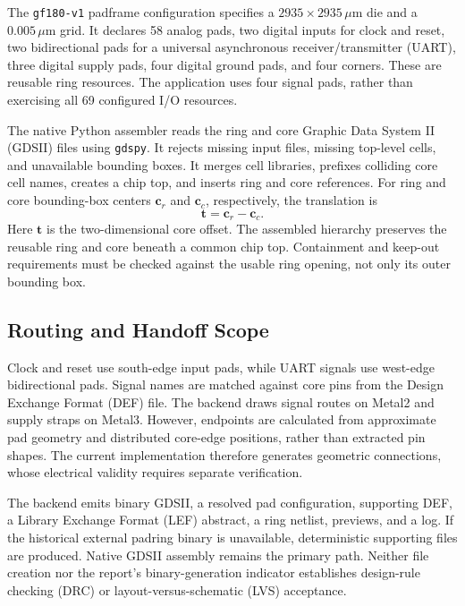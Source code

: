 \documentclass[conference,letterpaper]{IEEEtran}
\begin{document}
The \texttt{gf180-v1} padframe configuration specifies a $2935\times2935\,\mu$m die and a $0.005\,\mu$m grid. It declares 58 analog pads, two digital inputs for clock and reset, two bidirectional pads for a universal asynchronous receiver/transmitter (UART), three digital supply pads, four digital ground pads, and four corners. These are reusable ring resources. The application uses four signal pads, rather than exercising all 69 configured I/O resources.

The native Python assembler reads the ring and core Graphic Data System II (GDSII) files using \texttt{gdspy}. It rejects missing input files, missing top-level cells, and unavailable bounding boxes. It merges cell libraries, prefixes colliding core cell names, creates a chip top, and inserts ring and core references. For ring and core bounding-box centers $\mathbf{c}_r$ and $\mathbf{c}_c$, respectively, the translation is
\begin{equation}
\mathbf{t}=\mathbf{c}_r-\mathbf{c}_c .
\label{eq:translation}
\end{equation}
Here $\mathbf{t}$ is the two-dimensional core offset. The assembled hierarchy preserves the reusable ring and core beneath a common chip top. Containment and keep-out requirements must be checked against the usable ring opening, not only its outer bounding box.

\subsection{Routing and Handoff Scope}
Clock and reset use south-edge input pads, while UART signals use west-edge bidirectional pads. Signal names are matched against core pins from the Design Exchange Format (DEF) file. The backend draws signal routes on Metal2 and supply straps on Metal3. However, endpoints are calculated from approximate pad geometry and distributed core-edge positions, rather than extracted pin shapes. The current implementation therefore generates geometric connections, whose electrical validity requires separate verification.

The backend emits binary GDSII, a resolved pad configuration, supporting DEF, a Library Exchange Format (LEF) abstract, a ring netlist, previews, and a log. If the historical external padring binary is unavailable, deterministic supporting files are produced. Native GDSII assembly remains the primary path. Neither file creation nor the report's binary-generation indicator establishes design-rule checking (DRC) or layout-versus-schematic (LVS) acceptance.
\end{document}
